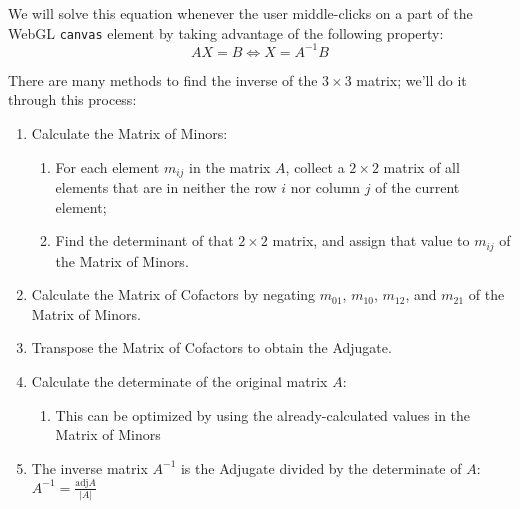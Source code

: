 \par We will solve this equation whenever the user middle-clicks on a part of the WebGL \texttt{canvas} element by taking advantage of the following property:
    \begin{equation}
    AX=B \iff X=A^{-1}B
    \end{equation}
\par There are many methods to find the inverse of the $3 \times 3$ matrix; we'll do it through this process:
\begin{enumerate}
    \item Calculate the Matrix of Minors:
        \begin{enumerate}
        \item For each element $m_{ij}$ in the matrix $A$, collect a $2 \times 2$ matrix of all elements that are in neither the row $i$ nor column $j$ of the current element;
        \item Find the determinant of that $2 \times 2$ matrix, and assign that value to $m_{ij}$ of the Matrix of Minors.
        \end{enumerate}
    \item Calculate the Matrix of Cofactors by negating $m_{01}$, $m_{10}$, $m_{12}$, and $m_{21}$ of the Matrix of Minors.
    \item Transpose the Matrix of Cofactors to obtain the Adjugate.
    \item Calculate the determinate of the original matrix $A$:
        \begin{enumerate}
        \item This can be optimized by using the already-calculated values in the Matrix of Minors
        \end{enumerate}
    \item The inverse matrix $A^{-1}$ is the Adjugate divided by the determinate of $A$: $A^{-1}=\frac{\text{adj}A}{|A|}$

\end{enumerate}
